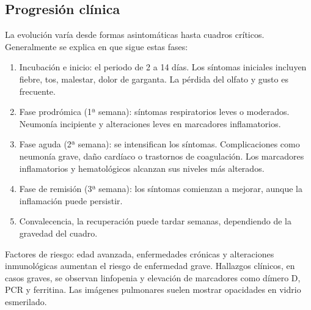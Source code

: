 \subsection{Progresión clínica}
La evolución varía desde formas asintomáticas hasta cuadros críticos. Generalmente se explica en \cite{cdc_covid19_yellowbook} que sigue estas fases:

\begin{enumerate}
    \item Incubación e inicio: el periodo de 2 a 14 días. Los síntomas iniciales incluyen fiebre, tos, malestar, dolor de garganta. La pérdida del olfato y gusto es frecuente.
    \item Fase prodrómica (1ª semana): síntomas respiratorios leves o moderados. Neumonía incipiente y alteraciones leves en marcadores inflamatorios.
    \item Fase aguda (2ª semana): se intensifican los síntomas. Complicaciones como neumonía grave, daño cardíaco o trastornos de coagulación. Los marcadores inflamatorios y hematológicos alcanzan sus niveles más alterados.
    \item Fase de remisión (3ª semana): los síntomas comienzan a mejorar, aunque la inflamación puede persistir.
    \item Convalecencia, la recuperación puede tardar semanas, dependiendo de la gravedad del cuadro.
\end{enumerate}

Factores de riesgo: edad avanzada, enfermedades crónicas y alteraciones inmunológicas aumentan el riesgo de enfermedad grave. Hallazgos clínicos, en casos graves, se observan linfopenia y elevación de marcadores como dímero D, PCR y ferritina. Las imágenes pulmonares suelen mostrar opacidades en vidrio esmerilado.

